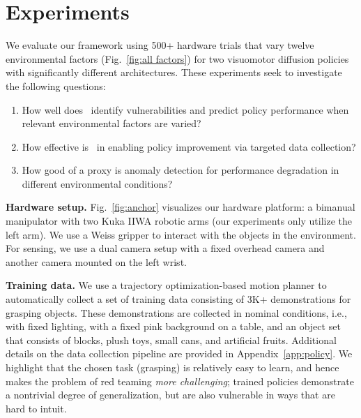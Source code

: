 \section{Experiments}
\label{sec:experiments}

We evaluate our framework using 500+ hardware trials that vary twelve environmental factors (Fig.~\ref{fig:all factors}) for two visuomotor diffusion policies with significantly different architectures. These experiments seek to investigate the following questions: 
\begin{enumerate}
\item How well does \redit~identify vulnerabilities and predict policy performance when relevant environmental factors are varied? 
\item How effective is \redit~in enabling policy improvement via targeted data collection? 
\item How good of a proxy is anomaly detection for performance degradation in different environmental conditions?
\end{enumerate}

{\bf Hardware setup.} 
Fig.~\ref{fig:anchor} visualizes our hardware platform: a bimanual manipulator with two Kuka IIWA robotic arms (our experiments only utilize the left arm). We use a Weiss gripper to interact with the objects in the environment. For sensing, we use a dual camera setup with a fixed overhead camera and another camera mounted on the left wrist.

{\bf Training data.} We use a trajectory optimization-based motion planner to automatically collect a set of training data consisting of 3K+ demonstrations for grasping objects. These demonstrations are collected in nominal conditions, i.e., with fixed lighting, with a fixed pink background on a table, and an object set that consists of blocks, plush toys, small cans, and artificial fruits. Additional details on the data collection pipeline are provided in Appendix~\ref{app:policy}. We highlight that the chosen task (grasping) is relatively easy to learn, and hence makes the problem of red teaming \emph{more challenging}; trained policies demonstrate a nontrivial degree of generalization, but are also vulnerable in ways that are hard to intuit.

